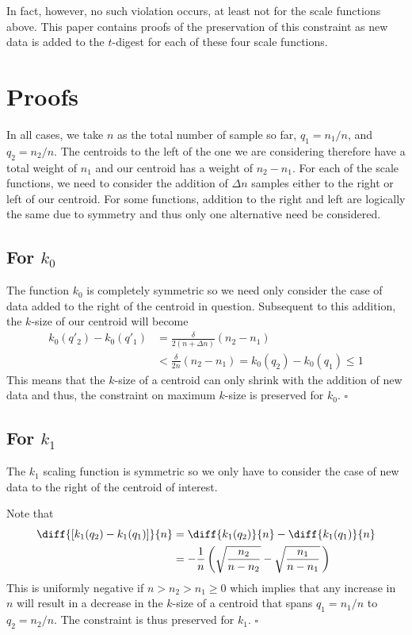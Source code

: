 \documentclass[11pt]{amsart}
\begin{document}
In fact, however, no such violation occurs, at least not for the scale functions above. This paper contains proofs of the preservation of this constraint as new data is added to the $t$-digest for each of these four scale functions.
\section{Proofs}
In all cases, we take $n$ as the total number of sample so far, $q_1 = n_1 / n$,  and $q_2 = n_2/n$. The centroids to the left of the one we are considering therefore have a total weight of $n_1$ and our centroid has a weight of $n_2-n_1$. For each of the scale functions, we need to consider the addition of $\Delta n$ samples either to the right or left of our centroid. For some functions, addition to the right and left are logically the same due to symmetry and thus only one alternative need be considered.
\subsection{For $k_0$}
The function $k_0$ is completely symmetric  so we need only consider the case of data added to the right of the centroid in question. Subsequent to this addition, the $k$-size of our centroid will become
\begin{align*}
k_0(q'_2)-k_0(q'_1) &=\frac \delta {2(n+\Delta n)}\left ( n_2 - n_1 \right) \\
&< \frac \delta {2n} \left ( n_2 - n_1 \right)=k_0(q_2) - k_0(q_1) \le 1 
\end{align*}
This means that the $k$-size of a centroid can only shrink with the addition of new data and thus, the constraint on maximum $k$-size is preserved for $k_0$.
$\square$
\subsection{For $k_1$}
The $k_1$ scaling function is symmetric so we only have to consider the case of new data to the right of the centroid of interest. 

Note that
\begin{align*}
\diff {\left[k_1(q_2)-k_1(q_1)\right]} {n} &= \diff {k_1(q_2)}{n} -\diff { k_1(q_1)} {n} \\
&= -\frac {1} n \left( \sqrt{\frac {n_2} {n-{n_2}}} - \sqrt{\frac {n_1} {n-{n_1}}} \,\right)
\end{align*}
This is uniformly negative if $n > n_2 > n_1\ge 0$ which implies that any increase in $n$ will result in a decrease in the $k$-size of a centroid that spans $q_1 = n_1/n$ to $q_2 = n_2/n$. The constraint is thus preserved for $k_1$.
$ \square$
\end{document}
